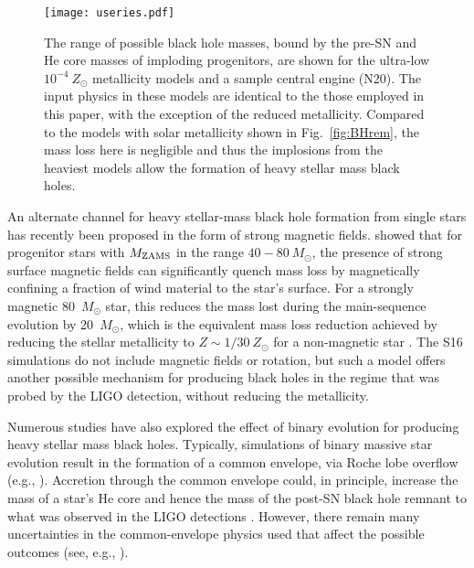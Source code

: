\documentclass[]{emulateapj}
\newcommand{\Ms}{M_{\odot}}
\newcommand{\Mz}{M_{\rm ZAMS}}
\begin{document}
\begin{figure}[ht]
\centering
\texttt{[image: useries.pdf]}
\caption{\label{fig:lowZ} The range of possible black hole masses, bound by the pre-SN and He core masses of imploding progenitors, are shown for the ultra-low $10^{-4}~Z_\odot$ metallicity models and a sample central engine (N20). The input physics in these models are identical to the those employed in this paper, with the exception of the reduced metallicity. Compared to the models with solar metallicity shown in Fig.~\ref{fig:BHrem}, the mass loss here is negligible and thus the implosions from the heaviest models allow the formation of heavy stellar mass black holes.}
\end{figure}

An alternate channel for heavy stellar-mass black hole formation from single stars has recently been proposed in the form of strong magnetic fields. \citet{Petit2017} showed that for progenitor stars with $\Mz$ in the range $40-80~\Ms$, the presence of strong surface magnetic fields can significantly quench mass loss by magnetically confining a fraction of wind material to the star's surface. For a strongly magnetic 80~$\Ms$ star, this reduces the mass lost during the main-sequence evolution by 20~$\Ms$, which is the equivalent mass loss reduction achieved by reducing the stellar metallicity to $Z\sim1/30~Z_{\odot}$ for a non-magnetic star \citep{Petit2017}. The S16 simulations do not include magnetic fields or rotation, but such a model offers another possible mechanism for producing black holes in the regime that was probed by the LIGO detection, without reducing the metallicity.

Numerous studies have also explored the effect of binary evolution for producing heavy stellar mass black holes. Typically, simulations of binary massive star evolution result in the formation of a common envelope, via Roche lobe overflow (e.g., \citealt{Voss2003}). Accretion through the common envelope could, in principle, increase the mass of a star's He core and hence the mass of the post-SN black hole remnant to what was observed in the LIGO detections \citep{Belczynski2016, Kruckow2016, Woosley2016, Eldridge2016, Stevenson2017}. However, there remain many uncertainties in the common-envelope physics used that affect the possible outcomes (see, e.g., \citealt{Ivanova2013}).
\end{document}
